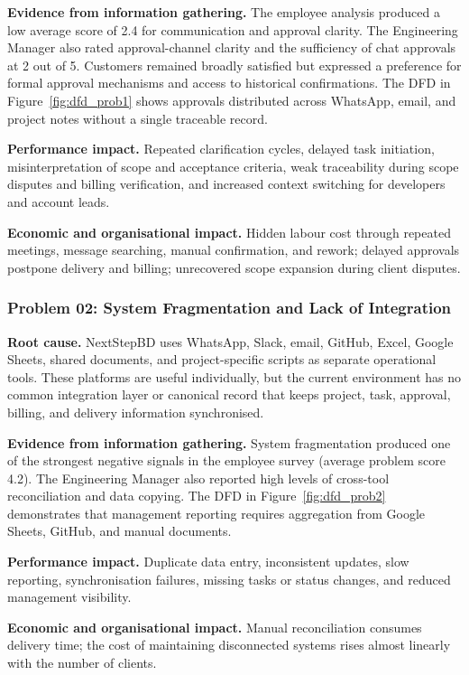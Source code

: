 \documentclass[12pt,a4paper]{report}
\begin{document}
\textbf{Evidence from information gathering.} The employee analysis produced a low average score
of 2.4 for communication and approval clarity. The Engineering Manager also rated
approval-channel clarity and the sufficiency of chat approvals at 2 out of 5. Customers remained
broadly satisfied but expressed a preference for formal approval mechanisms and access to
historical confirmations. The DFD in Figure~\ref{fig:dfd_prob1} shows approvals distributed
across WhatsApp, email, and project notes without a single traceable record.

\textbf{Performance impact.} Repeated clarification cycles, delayed task initiation,
misinterpretation of scope and acceptance criteria, weak traceability during scope disputes and
billing verification, and increased context switching for developers and account leads.

\textbf{Economic and organisational impact.} Hidden labour cost through repeated meetings,
message searching, manual confirmation, and rework; delayed approvals postpone delivery and
billing; unrecovered scope expansion during client disputes.

\subsubsection{Problem 02: System Fragmentation and Lack of Integration}
\textbf{Root cause.} NextStepBD uses WhatsApp, Slack, email, GitHub, Excel, Google Sheets, shared
documents, and project-specific scripts as separate operational tools. These platforms are useful
individually, but the current environment has no common integration layer or canonical record
that keeps project, task, approval, billing, and delivery information synchronised.

\textbf{Evidence from information gathering.} System fragmentation produced one of the strongest
negative signals in the employee survey (average problem score 4.2). The Engineering Manager
also reported high levels of cross-tool reconciliation and data copying. The DFD in
Figure~\ref{fig:dfd_prob2} demonstrates that management reporting requires aggregation from
Google Sheets, GitHub, and manual documents.

\textbf{Performance impact.} Duplicate data entry, inconsistent updates, slow reporting,
synchronisation failures, missing tasks or status changes, and reduced management visibility.

\textbf{Economic and organisational impact.} Manual reconciliation consumes delivery time; the
cost of maintaining disconnected systems rises almost linearly with the number of clients.
\end{document}
